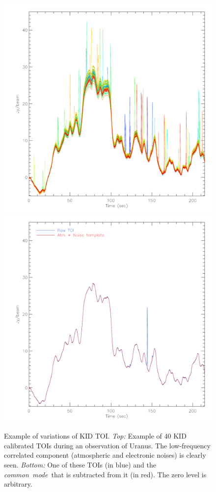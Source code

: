 \documentclass[traditionalabstract]{aa}
\newcommand{\cm}{\emph{common~mode}}
\newcommand{\lp}[1]{#1}
\begin{document}
{\begin{figure}[ht!]
\begin{center}
\includegraphics[clip, angle=0, scale=0.4]{Figures/toi_plot-eps-converted-to.pdf}
\includegraphics[clip, angle=0, scale=0.4]{Figures/toi_plot_decorr-eps-converted-to.pdf}
\caption[Example of Time-Ordered-Information]{Example of variations of KID
  TOI. \emph{Top:} Example of 40 KID {\lp calibrated} TOIs during an observation
  of Uranus. The low-frequency correlated component (atmospheric and electronic
  noises) is clearly seen. \emph{Bottom:} One of these TOIs (in blue) and the
  \cm\ that is subtracted from it (in red). {\lp The zero level is arbitrary.}}
\label{fig:nika_toi}
\end{center}
\end{figure}

}
\end{document}
